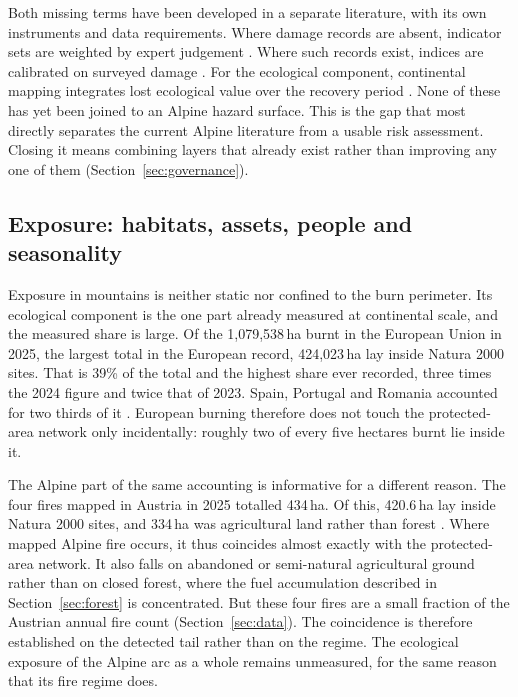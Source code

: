 \documentclass[11pt,a4paper]{article}
\begin{document}
Both missing terms have been developed in a separate literature, with its own instruments and data requirements. Where damage records are absent, indicator sets are weighted by expert judgement \citep{papathomakohle_towards_2025}. Where such records exist, indices are calibrated on surveyed damage \citep{papathomakohle_wildfire_2022}. For the ecological component, continental mapping integrates lost ecological value over the recovery period \citep{arrogantefunes_mapping_2024}. None of these has yet been joined to an Alpine hazard surface. This is the gap that most directly separates the current Alpine literature from a usable risk assessment. Closing it means combining layers that already exist rather than improving any one of them (Section~\ref{sec:governance}).

\subsection{Exposure: habitats, assets, people and seasonality}

Exposure in mountains is neither static nor confined to the burn perimeter. Its ecological component is the one part already measured at continental scale, and the measured share is large. Of the 1{,}079{,}538\,ha burnt in the European Union in 2025, the largest total in the European record, 424{,}023\,ha lay inside Natura 2000 sites. That is 39\% of the total and the highest share ever recorded, three times the 2024 figure and twice that of 2023. Spain, Portugal and Romania accounted for two thirds of it \citep{jrc_advance_2026}. European burning therefore does not touch the protected-area network only incidentally: roughly two of every five hectares burnt lie inside it.

The Alpine part of the same accounting is informative for a different reason. The four fires mapped in Austria in 2025 totalled 434\,ha. Of this, 420.6\,ha lay inside Natura 2000 sites, and 334\,ha was agricultural land rather than forest \citep{jrc_advance_2026}. Where mapped Alpine fire occurs, it thus coincides almost exactly with the protected-area network. It also falls on abandoned or semi-natural agricultural ground rather than on closed forest, where the fuel accumulation described in Section~\ref{sec:forest} is concentrated. But these four fires are a small fraction of the Austrian annual fire count (Section~\ref{sec:data}). The coincidence is therefore established on the detected tail rather than on the regime. The ecological exposure of the Alpine arc as a whole remains unmeasured, for the same reason that its fire regime does.
\end{document}
